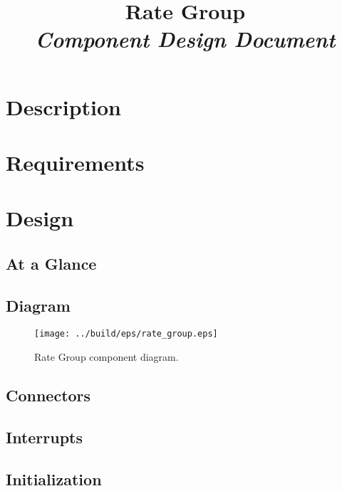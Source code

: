 



\title{\textbf{Rate Group} \\
\large\textit{Component Design Document}}
\date{}
\maketitle

\section{Description}


\section{Requirements}


\section{Design}

\subsection{At a Glance}


\subsection{Diagram}
\begin{figure}[H]
  \texttt{[image: ../build/eps/rate\_group.eps]}
  \caption{Rate Group component diagram.}
\end{figure}

\subsection{Connectors}


\subsection{Interrupts}



\subsection{Initialization}


